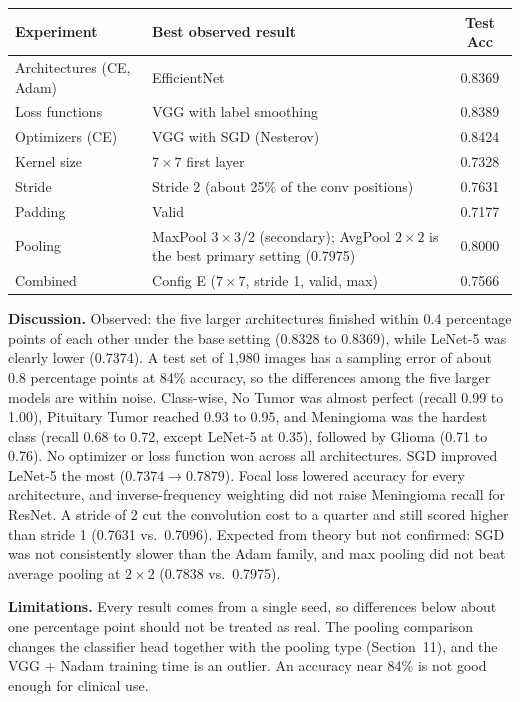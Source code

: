 \documentclass[12pt,a4paper]{article}
\begin{document}
\begin{center}
\renewcommand{\arraystretch}{1.2}\footnotesize
\begin{tabularx}{\textwidth}{|l|X|c|}
\hline
\textbf{Experiment} & \textbf{Best observed result} & \textbf{Test Acc} \\ \hline
Architectures (CE, Adam) & EfficientNet & 0.8369 \\ \hline
Loss functions & VGG with label smoothing & 0.8389 \\ \hline
Optimizers (CE) & VGG with SGD (Nesterov) & 0.8424 \\ \hline
Kernel size & $7\times7$ first layer & 0.7328 \\ \hline
Stride & Stride 2 (about 25\% of the conv positions) & 0.7631 \\ \hline
Padding & Valid & 0.7177 \\ \hline
Pooling & MaxPool $3\times3$/2 (secondary); AvgPool $2\times2$ is the best primary setting (0.7975) & 0.8000 \\ \hline
Combined & Config E ($7\times7$, stride 1, valid, max) & 0.7566 \\ \hline
\end{tabularx}
\end{center}

\textbf{Discussion.} Observed: the five larger architectures finished within 0.4 percentage points of each other
under the base setting (0.8328 to 0.8369), while LeNet-5 was clearly lower (0.7374). A test set of 1,980 images has
a sampling error of about 0.8 percentage points at 84\% accuracy, so the differences among the five larger models are
within noise. Class-wise, No Tumor was almost perfect (recall 0.99 to 1.00), Pituitary Tumor reached 0.93 to 0.95,
and Meningioma was the hardest class (recall 0.68 to 0.72, except LeNet-5 at 0.35), followed by Glioma
(0.71 to 0.76). No optimizer or loss function won across all architectures. SGD improved LeNet-5 the most
($0.7374\to0.7879$). Focal loss lowered accuracy for every architecture, and inverse-frequency weighting did not
raise Meningioma recall for ResNet. A stride of 2 cut the convolution cost to a quarter and still scored higher
than stride 1 (0.7631 vs.\ 0.7096). Expected from theory but not confirmed: SGD was not consistently slower than the
Adam family, and max pooling did not beat average pooling at $2\times2$ (0.7838 vs.\ 0.7975).

\textbf{Limitations.} Every result comes from a single seed, so differences below about one percentage point should
not be treated as real. The pooling comparison changes the classifier head together with the pooling type
(Section~11), and the VGG + Nadam training time is an outlier. An accuracy near 84\% is not good enough for
clinical use.
\end{document}
